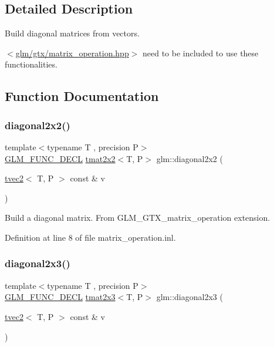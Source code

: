 \subsection{Detailed Description}
Build diagonal matrices from vectors. 

$<$\mbox{\hyperlink{matrix__operation_8hpp}{glm/gtx/matrix\+\_\+operation.\+hpp}}$>$ need to be included to use these functionalities. 

\subsection{Function Documentation}
\mbox{\label{group__gtx__matrix__operation_ga01dc503262dba9c457113d131fc8c024}} 
\subsubsection{\texorpdfstring{diagonal2x2()}{diagonal2x2()}}
{\footnotesize\ttfamily template$<$typename T , precision P$>$ \\
\mbox{\hyperlink{setup_8hpp_ab2d052de21a70539923e9bcbf6e83a51}{G\+L\+M\+\_\+\+F\+U\+N\+C\+\_\+\+D\+E\+CL}} \mbox{\hyperlink{structglm_1_1tmat2x2}{tmat2x2}}$<$T, P$>$ glm\+::diagonal2x2 (\begin{DoxyParamCaption}\item[{\mbox{\hyperlink{structglm_1_1tvec2}{tvec2}}$<$ T, P $>$ const \&}]{v }\end{DoxyParamCaption})}

Build a diagonal matrix. From G\+L\+M\+\_\+\+G\+T\+X\+\_\+matrix\+\_\+operation extension. 

Definition at line 8 of file matrix\+\_\+operation.\+inl.

\mbox{\label{group__gtx__matrix__operation_ga763817f07d6a94b722a48adfa87a35db}} 
\subsubsection{\texorpdfstring{diagonal2x3()}{diagonal2x3()}}
{\footnotesize\ttfamily template$<$typename T , precision P$>$ \\
\mbox{\hyperlink{setup_8hpp_ab2d052de21a70539923e9bcbf6e83a51}{G\+L\+M\+\_\+\+F\+U\+N\+C\+\_\+\+D\+E\+CL}} \mbox{\hyperlink{structglm_1_1tmat2x3}{tmat2x3}}$<$T, P$>$ glm\+::diagonal2x3 (\begin{DoxyParamCaption}\item[{\mbox{\hyperlink{structglm_1_1tvec2}{tvec2}}$<$ T, P $>$ const \&}]{v }\end{DoxyParamCaption})}

